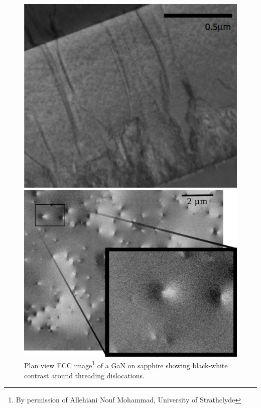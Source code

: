 \begin{figure}
\centering
\noindent\begin{minipage}{0.47\textwidth}
    \centering
    \includegraphics[width=0.9\linewidth, height=0.25\textheight]{Figures/TEM.png}
    \captionsetup{width=0.8\linewidth}
    \caption[AlGaN TEM.]{Transversal TEM image\footnote{Taken at the Kelvin Nanocharacterisation Center, University of Glasgow. ~~By permission of David Thomson, University of Strathclyde} of an AlGaN on sapphire showing threading dislocations reaching an interface.}
     \label{fig:tem}
\end{minipage}
\;\;\;
\begin{minipage}{0.48\textwidth}
     \centering
     \includegraphics[width=0.9\linewidth, height=0.25\textheight]{Figures/ECCI.png}
      \captionsetup{width=0.8\linewidth}
     \caption[GaN ECCI.]{Plan view ECC image\footnote{By permission of Allehiani Nouf Mohammad, University of Strathclyde} of a \hkl[0001] GaN on sapphire showing black-white contrast around threading dislocations.}
     \label{fig:ecci}
\end{minipage}
\end{figure}

